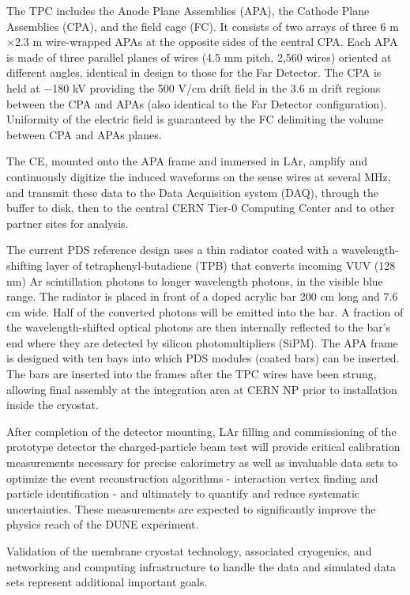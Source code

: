 \documentclass[11pt, oneside]{article}   	%
\begin{document}
The TPC includes the Anode Plane Assemblies (APA), the Cathode Plane Assemblies (CPA), and the field cage (FC). It consists of two arrays of three 6 m$\times$2.3 m wire-wrapped APAs at the opposite sides of the central CPA. Each APA is made of three parallel planes of wires (4.5 mm pitch, 2,560 wires) oriented at different angles, identical in design to those for the Far Detector. The CPA is held at $-$180 kV providing the 500 V/cm drift field in the 3.6 m drift regions between the CPA and APAs (also identical to the Far Detector configuration). Uniformity of the electric field is guaranteed by the FC delimiting the volume between CPA and APAs planes.

The CE, mounted onto the APA frame and immersed in LAr, amplify and continuously digitize the induced waveforms on the sense wires at several MHz, and transmit these data to the Data Acquisition system (DAQ), through the buffer to disk, then to the central CERN Tier-0 Computing Center and to other partner sites for analysis.  

The current PDS reference design uses a thin radiator coated with a wavelength-shifting layer of tetraphenyl-butadiene (TPB) that converts incoming VUV (128 nm) Ar scintillation photons to longer wavelength photons, in the visible blue range. The radiator is placed in front of a doped acrylic bar 200 cm long and 7.6 cm wide. Half of the converted photons will be emitted into the bar. A fraction of the wavelength-shifted optical photons are then internally reflected to the bar's end where they are detected by silicon photomultipliers (SiPM).
The APA frame is designed with ten bays into which PDS modules (coated bars) can be inserted. The bars are inserted into the frames after the TPC wires have been strung, allowing final assembly at the integration area at CERN NP prior to installation inside the cryostat. 

After completion of the detector mounting, LAr filling and commissioning of the prototype detector the charged-particle beam test will provide critical calibration measurements necessary for precise calorimetry as well as invaluable data sets to optimize the event reconstruction algorithms - interaction vertex finding and particle identification - and ultimately to quantify and reduce systematic uncertainties. These measurements are expected to significantly improve the physics reach of the DUNE experiment.

Validation of the membrane cryostat technology, associated cryogenics, and networking and computing infrastructure to handle the data and simulated data sets represent additional important goals. 
\end{document}
